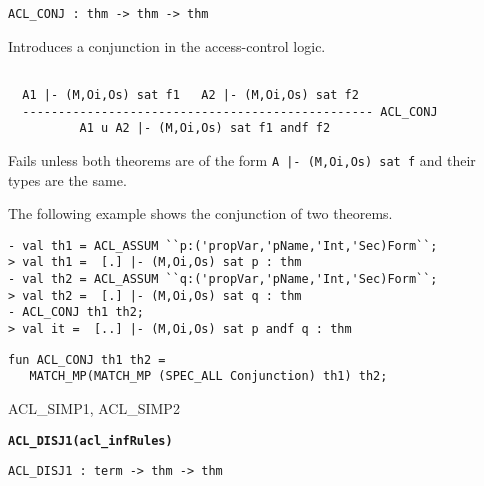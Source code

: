\begin{verbatim}
ACL_CONJ : thm -> thm -> thm
\end{verbatim}

\SYNOPSIS
Introduces a conjunction in the access-control logic.

\DESCRIBE
\begin{verbatim}

  A1 |- (M,Oi,Os) sat f1   A2 |- (M,Oi,Os) sat f2
  ------------------------------------------------- ACL_CONJ
          A1 u A2 |- (M,Oi,Os) sat f1 andf f2
\end{verbatim}

\FAILURE 
Fails unless both theorems are of the form \texttt{A |- (M,Oi,Os) sat
f} and their types are the same.  

\EXAMPLE
The following example shows the conjunction of two theorems.
\begin{holboxed}
\begin{verbatim}
- val th1 = ACL_ASSUM ``p:('propVar,'pName,'Int,'Sec)Form``;
> val th1 =  [.] |- (M,Oi,Os) sat p : thm
- val th2 = ACL_ASSUM ``q:('propVar,'pName,'Int,'Sec)Form``;
> val th2 =  [.] |- (M,Oi,Os) sat q : thm
- ACL_CONJ th1 th2;
> val it =  [..] |- (M,Oi,Os) sat p andf q : thm
\end{verbatim}
\end{holboxed}


\IMPLEMENTATION
\begin{holboxed}
\begin{verbatim}
fun ACL_CONJ th1 th2 = 
   MATCH_MP(MATCH_MP (SPEC_ALL Conjunction) th1) th2;
\end{verbatim}
\end{holboxed}

\SEEALSO
ACL\_SIMP1, ACL\_SIMP2
\ENDDOC

\begin{holboxed}
  \begin{Large}
    \textbf{\texttt{ACL\_DISJ1}}\hfill{}\textbf{\texttt{(acl\_infRules)}}
  \end{Large}
\end{holboxed}
\begin{verbatim}
ACL_DISJ1 : term -> thm -> thm
\end{verbatim}

